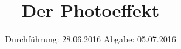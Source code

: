 

\subject{V500}
\title{Der Photoeffekt}
\date{
  Durchführung: 28.06.2016
  \hspace{3em}
  Abgabe: 05.07.2016
}



\maketitle
\thispagestyle{empty}
\tableofcontents
\newpage








\printbibliography


